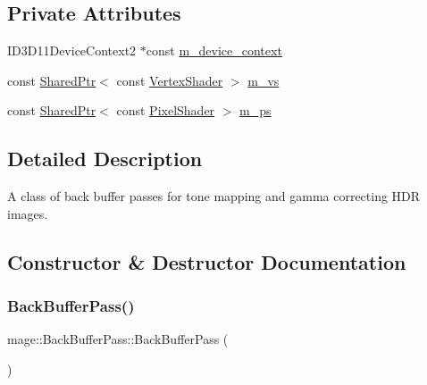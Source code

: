 \subsection*{Private Attributes}
\begin{DoxyCompactItemize}
\item 
I\+D3\+D11\+Device\+Context2 $\ast$const \hyperlink{classmage_1_1_back_buffer_pass_a8cf9c4489733b17402dc33ed2dbe2bcc}{m\+\_\+device\+\_\+context}
\item 
const \hyperlink{namespacemage_a1e01ae66713838a7a67d30e44c67703e}{Shared\+Ptr}$<$ const \hyperlink{classmage_1_1_vertex_shader}{Vertex\+Shader} $>$ \hyperlink{classmage_1_1_back_buffer_pass_ac2117930285072c5063881124ba38a5f}{m\+\_\+vs}
\item 
const \hyperlink{namespacemage_a1e01ae66713838a7a67d30e44c67703e}{Shared\+Ptr}$<$ const \hyperlink{namespacemage_a27ecaf266420ee7a494d64edc0757129}{Pixel\+Shader} $>$ \hyperlink{classmage_1_1_back_buffer_pass_a3890afe2710539dfe25ce95be802c2fc}{m\+\_\+ps}
\end{DoxyCompactItemize}


\subsection{Detailed Description}
A class of back buffer passes for tone mapping and gamma correcting H\+DR images. 

\subsection{Constructor \& Destructor Documentation}
\hypertarget{classmage_1_1_back_buffer_pass_a46ce63d05208fc3dea43244713a6a280}{}\label{classmage_1_1_back_buffer_pass_a46ce63d05208fc3dea43244713a6a280} 
\subsubsection{\texorpdfstring{Back\+Buffer\+Pass()}{BackBufferPass()}\hspace{0.1cm}{\footnotesize\ttfamily [1/3]}}
{\footnotesize\ttfamily mage\+::\+Back\+Buffer\+Pass\+::\+Back\+Buffer\+Pass (\begin{DoxyParamCaption}{ }\end{DoxyParamCaption})}

